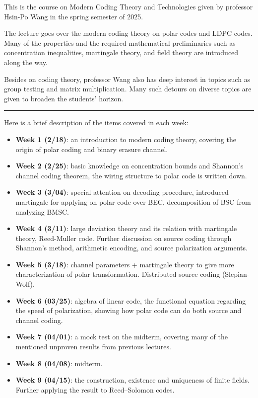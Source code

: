 This is the course on Modern Coding Theory and Technologies given by professor Hsin-Po Wang in the spring semester of 2025.

The lecture goes over the modern coding theory on polar codes and LDPC codes. Many of the properties and the required mathematical preliminaries such as concentration inequalities, martingale theory, and field theory are introduced along the way.

Besides on coding theory, professor Wang also has deep interest in topics such as group testing and matrix multiplication. Many such detours on diverse topics are given to broaden the students' horizon.

\vspace{1cm}
\hrule

Here is a brief description of the items covered in each week:
\begin{itemize}
    \item \textbf{Week 1 (2/18)}: an introduction to modern coding theory, covering the origin of polar coding and binary erasure channel.
    \item \textbf{Week 2 (2/25)}: basic knowledge on concentration bounds and Shannon's channel coding theorem, the wiring structure to polar code is written down.
    \item \textbf{Week 3 (3/04)}: special attention on decoding procedure, introduced martingale for applying on polar code over BEC, decomposition of BSC from analyzing BMSC.
    \item \textbf{Week 4 (3/11)}: large deviation theory and its relation with martingale theory, Reed-Muller code. Further discussion on source coding through Shannon's method, arithmetic encoding, and source polarization arguments.
    \item \textbf{Week 5 (3/18)}: channel parameters + martingale theory to give more characterization of polar transformation. Distributed source coding (Slepian-Wolf).
    \item \textbf{Week 6 (03/25)}: algebra of linear code, the functional equation regarding the speed of polarization, showing how polar code can do both source and channel coding.
    \item \textbf{Week 7 (04/01)}: a mock test on the midterm, covering many of the mentioned unproven results from previous lectures.
    \item \textbf{Week 8 (04/08)}: midterm.
    \item \textbf{Week 9 (04/15)}: the construction, existence and uniqueness of finite fields. Further applying the result to Reed--Solomon codes.

\end{itemize}
